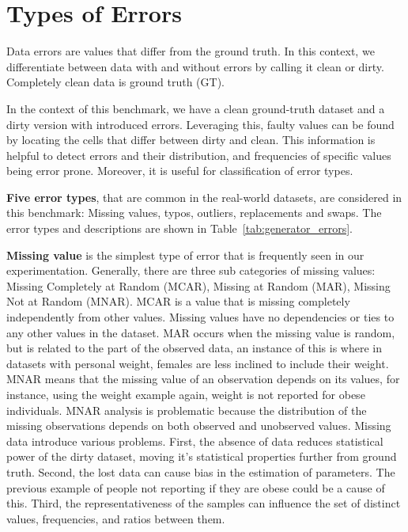 \section{Types of Errors}
\label{sec:error_types}

Data errors are values that differ from the ground truth.
In this context, we differentiate between data with and without errors by calling it clean or dirty. 
Completely clean data is ground truth (GT).  


In the context of this benchmark, we have a clean ground-truth dataset and a dirty version with introduced errors.  
Leveraging this, faulty values can be found by locating the cells that differ between dirty and clean. 
This information is helpful to detect errors and their distribution, and frequencies of specific values being error prone.  
Moreover, it is useful for classification of error types.


\textbf{Five error types}, that are common in the real-world datasets, are considered in this benchmark: 
Missing values, typos, outliers, replacements and swaps. 
The error types and descriptions are shown in Table~\ref{tab:generator_errors}.


\textbf{Missing value} is the simplest type of error that is frequently seen in our experimentation. 
Generally, there are three sub categories of missing values: 
Missing Completely at Random (MCAR), Missing at Random (MAR), Missing Not at Random (MNAR). 
MCAR is a value that is missing completely independently from other values. 
Missing values have no dependencies or ties to any other values in the dataset. 
MAR occurs when the missing value is random, but is related to the part of the observed data, an instance of this is where in datasets with personal weight, females are less inclined to include their weight. 
MNAR means that the missing value of an observation depends on its values, for instance, using the weight example again, weight is not reported for obese individuals.
MNAR analysis is problematic because the distribution of the missing observations depends on both observed and unobserved values.
Missing data introduce various problems. 
First, the absence of data reduces statistical power of the dirty dataset, moving it's statistical properties further from ground truth.
Second, the lost data can cause bias in the estimation of parameters. The previous example of people not reporting if they are obese could be a cause of this. 
Third, the representativeness of the samples can influence the set of distinct values, frequencies, and ratios between them.

